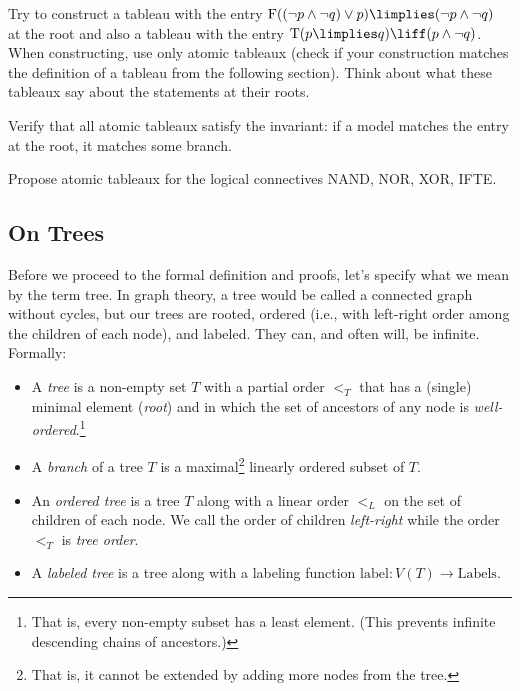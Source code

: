 \begin{exercise}\label{exercise:construct-tableaux}
    Try to construct a tableau with the entry $\mathrm{F}((\neg p \land \neg q) \lor p) \limplies (\neg p \land \neg q)$ at the root and also a tableau with the entry $\mathrm{T}(p \limplies q) \liff (p \land \neg q)$. When constructing, use only atomic tableaux (check if your construction matches the definition of a tableau from the following section). Think about what these tableaux say about the statements at their roots.
\end{exercise}

\begin{exercise}
Verify that all atomic tableaux satisfy the invariant: if a model matches the entry at the root, it matches some branch.
\end{exercise}

\begin{exercise}
Propose atomic tableaux for the logical connectives NAND, NOR, XOR, IFTE.
\end{exercise}

\subsection{On Trees}
Before we proceed to the formal definition and proofs, let's specify what we mean by the term tree. In graph theory, a tree would be called a connected graph without cycles, but our trees are rooted, ordered (i.e., with left-right order among the children of each node), and labeled. They can, and often will, be infinite. Formally:

\begin{definition}[Tree]
\begin{itemize}
\item A \emph{tree} is a non-empty set $T$ with a partial order $<_T$ that has a (single) minimal element (\emph{root}) and in which the set of ancestors of any node is \emph{well-ordered}.\footnote{That is, every non-empty subset has a least element. (This prevents infinite descending chains of ancestors.)}
\item A \emph{branch} of a tree $T$ is a maximal\footnote{That is, it cannot be extended by adding more nodes from the tree.} linearly ordered subset of $T$.
\item An \emph{ordered tree} is a tree $T$ along with a linear order $<_L$ on the set of children of each node. We call the order of children \emph{left-right} while the order $<_T$ is \emph{tree order}.
\item A \emph{labeled tree} is a tree along with a labeling function $\mathrm{label}\colon V(T) \to \mathrm{Labels}$.
\end{itemize}
\end{definition}

